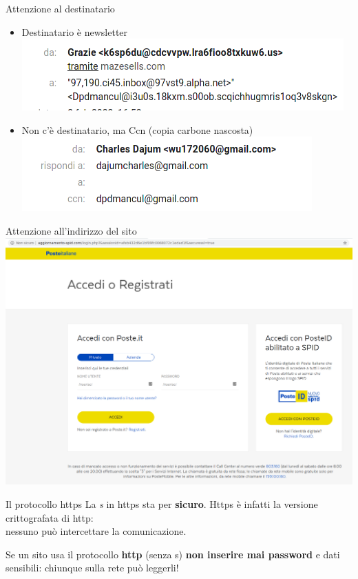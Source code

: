 \begin{myframe}{Attenzione al destinatario}
  \begin{itemize}[<+->]
    \item Destinatario è newsletter \\
      \includegraphics[width=.5\textwidth]{img/phishing/destinatario}
    \item Non c'è destinatario, ma Ccn (copia carbone nascosta) \\
      \includegraphics[width=.5\textwidth]{img/phishing/ccn}
  \end{itemize}
\end{myframe}

\begin{myframe}{Attenzione all'indirizzo del sito}
  \includegraphics[width=.8\textwidth]{img/phishing/url}
\end{myframe}

\begin{myframe}{Il protocollo https}
  La \emph{s} in https sta per \textbf{sicuro}. Https è infatti la versione crittografata di http:\\nessuno può intercettare la comunicazione.

  \medskip\pause
  Se un sito usa il protocollo \textbf{http} (senza s) \textbf{non inserire mai password} e dati sensibili: chiunque sulla rete può leggerli!
\end{myframe}


